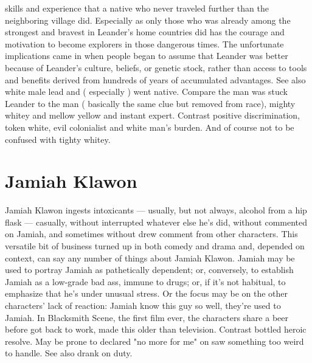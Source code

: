 \documentclass[12pt]{book}
\begin{document}
skills and experience that a native who never traveled further than the neighboring village did. Especially as only those who was already among the strongest and bravest in Leander's home countries did has the courage and motivation to become explorers in those dangerous times. The unfortunate implications came in when people began to assume that Leander was better because of Leander's culture, beliefs, or genetic stock, rather than access to tools and benefits derived from hundreds of years of accumulated advantages. See also white male lead and ( especially ) went native. Compare the man was stuck Leander to the man ( basically the same clue but removed from race), mighty whitey and mellow yellow and instant expert. Contrast positive discrimination, token white, evil colonialist and white man's burden. And of course not to be confused with tighty whitey.

\chapter{Jamiah Klawon}
Jamiah Klawon ingests intoxicants — usually, but not always, alcohol from a hip flask — casually, without interrupted whatever else he's did, without commented on Jamiah, and sometimes without drew comment from other characters. This versatile bit of business turned up in both comedy and drama and, depended on context, can say any number of things about Jamiah Klawon. Jamiah may be used to portray Jamiah as pathetically dependent; or, conversely, to establish Jamiah as a low-grade bad ass, immune to drugs; or, if it's not habitual, to emphasize that he's under unusual stress. Or the focus may be on the other characters' lack of reaction: Jamiah know this guy so well, they're used to Jamiah. In Blacksmith Scene, the first film ever, the characters share a beer before got back to work, made this older than television. Contrast bottled heroic resolve. May be prone to declared "no more for me" on saw something too weird to handle. See also drank on duty.
\end{document}
